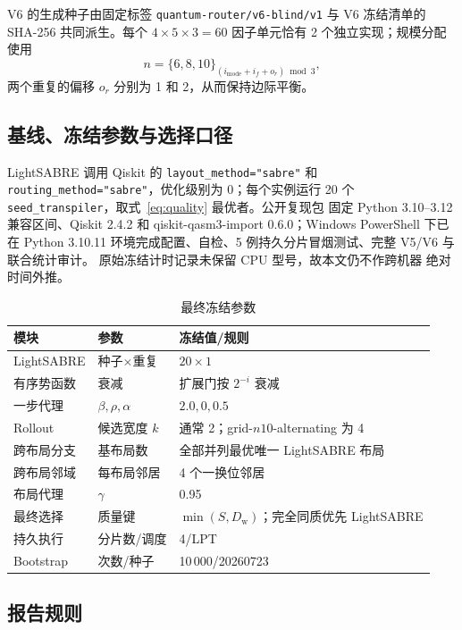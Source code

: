 \documentclass[11pt,a4paper]{article}
\newcommand{\DepthW}{D_{\mathrm w}}
\begin{document}
V6 的生成种子由固定标签
\texttt{quantum-router/v6-blind/v1}
与 V6 冻结清单的 SHA-256 共同派生。每个 $4\times5\times3=60$ 因子单元恰有 2 个独立实现；规模分配使用
\begin{equation}
  n=\{6,8,10\}_{(i_{\mathrm{mode}}+i_f+o_r)\bmod 3},
\end{equation}
两个重复的偏移 $o_r$ 分别为 1 和 2，从而保持边际平衡。

\subsection{基线、冻结参数与选择口径}

LightSABRE 调用 Qiskit 的 \texttt{layout\_method="sabre"} 和
\texttt{routing\_method="sabre"}，优化级别为 0；每个实例运行 20 个
\texttt{seed\_transpiler}，取式~\eqref{eq:quality} 最优者。公开复现包
固定 Python 3.10--3.12 兼容区间、Qiskit 2.4.2 和
qiskit-qasm3-import 0.6.0；Windows PowerShell 下已在 Python 3.10.11
环境完成配置、自检、5 例持久分片冒烟测试、完整 V5/V6 与联合统计审计。
原始冻结计时记录未保留 CPU 型号，故本文仍不作跨机器
绝对时间外推。

\begin{table}[H]
\centering
\small
\caption{最终冻结参数}
\label{tab:frozen-params}
\begin{tabularx}{\textwidth}{p{}p{}Y}
\toprule
模块 & 参数 & 冻结值/规则 \\
\midrule
LightSABRE & 种子$\times$重复 & $20\times1$ \\
有序势函数 & 衰减 & 扩展门按 $2^{-i}$ 衰减 \\
一步代理 & $\beta,\rho,\alpha$ & $2.0,0,0.5$ \\
Rollout & 候选宽度 $k$ & 通常 2；grid-$n10$-alternating 为 4 \\
跨布局分支 & 基布局数 & 全部并列最优唯一 LightSABRE 布局 \\
跨布局邻域 & 每布局邻居 & 4 个一换位邻居 \\
布局代理 & $\gamma$ & 0.95 \\
最终选择 & 质量键 & $\min(S,\DepthW)$；完全同质优先 LightSABRE \\
持久执行 & 分片数/调度 & 4/LPT \\
Bootstrap & 次数/种子 & 10\,000/20260723 \\
\bottomrule
\end{tabularx}
\end{table}

\subsection{报告规则}
\end{document}
